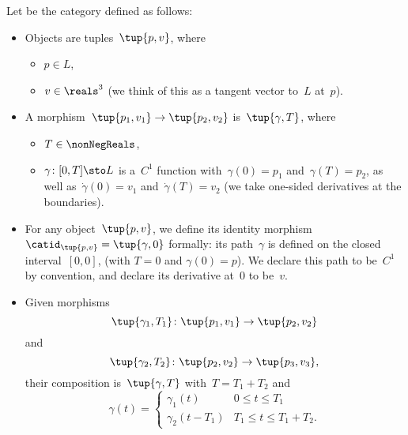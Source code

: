 \begin{definition}[\Berg]
    \label{def:Berg}
    Let \Berg be the category defined as follows:
    \begin{itemize}
        \item Objects are tuples~$\tup{p,v}$, where
              \begin{itemize}
                  \item $p \in L$,
                  \item $v \in \reals^3$ (we think of this as a tangent vector to~$L$ at~$p$).
              \end{itemize}

        \item A morphism~$\tup{p_1, v_1} \to \tup{p_2, v_2}$ is~$\tup{\gamma, T}$,
              where
              \begin{itemize}
                  \item $T \in \nonNegReals$,
                  \item $\gamma \colon [0, T] \sto L$ is a~$C^1$ function with~$\gamma(0)=p_1$ and~$\gamma(T)=p_2$, as well as~$\dot \gamma(0) = v_1$ and~$\dot \gamma(T) = v_2$  (we take one-sided derivatives at the boundaries).
              \end{itemize}
        \item For any object~$\tup{p, v}$, we define its identity morphism~$\catid_{\tup{p,v}} = \tup{\gamma, 0}$ formally: its path~$\gamma$ is defined on the closed interval~$[0,0]$, (with $T=0$ and $\gamma(0) = p$).
              We declare this path to be~$C^1$ by convention, and declare its derivative at~$0$ to be~$v$.

        \item Given morphisms
              \begin{equation}
                  \tup{\gamma_1, T_1}\colon \tup{p_1, v_1} \to \tup{p_2, v_2}
              \end{equation}
              and
              \begin{equation}
                  \tup{\gamma_2, T_2}\colon \tup{p_2, v_2} \to \tup{p_3, v_3},
              \end{equation}
              their composition is~$\tup{\gamma, T}$ with~$T = T_1 + T_2$ and
              \begin{equation}
                  \gamma(t) = \begin{cases}
                      \gamma_1(t)       & 0 \leq t \leq T_1          \\
                      \gamma_2(t - T_1) & T_1 \leq t \leq T_1 + T_2.
                  \end{cases}
              \end{equation}
    \end{itemize}
\end{definition}


